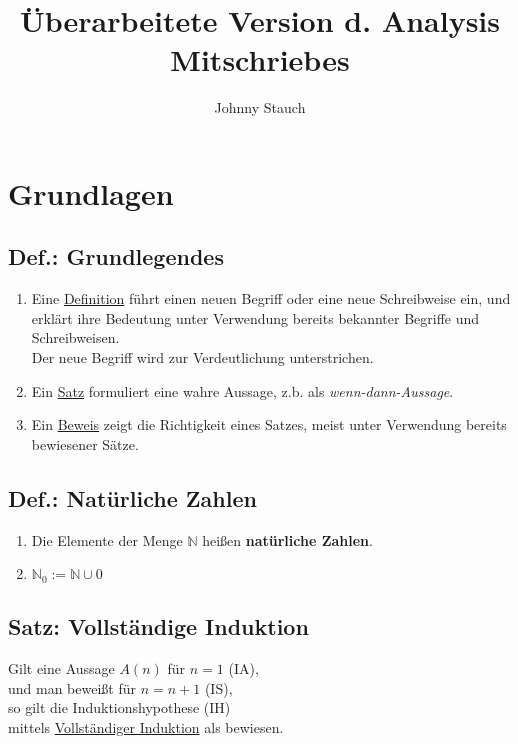 \documentclass[a4paper,11pt]{article}
\author{Johnny Stauch}
\title{Überarbeitete Version d. Analysis Mitschriebes}
\begin{document}
\maketitle
\tableofcontents


\section{Grundlagen}
\subsection{Def.: Grundlegendes}
\begin{enumerate}[label={\alph*)}]
	\item Eine \underline{Definition} führt einen neuen Begriff oder eine neue Schreibweise ein, und erklärt ihre Bedeutung unter Verwendung bereits bekannter Begriffe und Schreibweisen.\\
	Der neue Begriff wird zur Verdeutlichung unterstrichen.
	\item Ein \underline{Satz} formuliert eine wahre Aussage, z.b. als \emph{wenn-dann-Aussage}.
	\item Ein \underline{Beweis} zeigt die Richtigkeit eines Satzes, meist unter Verwendung bereits bewiesener Sätze.
\end{enumerate}
\subsection{Def.: Natürliche Zahlen}
\begin{enumerate}[label={\alph*)}]
	\item Die Elemente der Menge \( \mathbb{N} \) heißen \textbf{natürliche Zahlen}.
	\item \(\mathbb{N}_{0}:=\mathbb{N} \cup 0\)
\end{enumerate}
\subsection{Satz: Vollständige Induktion}
Gilt eine Aussage $A(n)$ für $n=1$ (IA),\\
und man beweißt für $n=n+1$ (IS),\\
so gilt die Induktionshypothese (IH)\\
mittels \underline{Vollständiger Induktion} als bewiesen.
\end{document}
